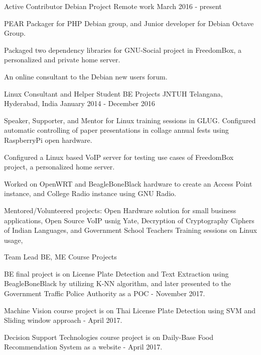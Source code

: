 \begin{cventries}
    \cventry 
    {Active Contributor}
    {Debian Project}
    {Remote work}
    {March 2016 - present}
    {\begin{cvitems}
        \item {PEAR Packager for PHP Debian group, and Junior developer for Debian Octave Group.}
        \item {Packaged two dependency libraries for GNU-Social project in FreedomBox, a personalized and private home server.}
        \item {An online consultant to the Debian new users forum.}
    \end{cvitems}}
    \cventry
    {Linux Consultant and Helper Student BE Projects}
    {JNTUH}
    {Telangana, Hyderabad, India}
    {January 2014 - December 2016}
    {
        \begin{cvitems}
        \item {Speaker, Supporter, and Mentor for Linux training sessions in GLUG. Configured automatic controlling of paper presentations in collage annual fests using RaspberryPi open hardware.}
        \item Configured a Linux based VoIP server for testing use cases of FreedomBox project, a personalized home server.
        \item {Worked on OpenWRT and BeagleBoneBlack hardware to create an Access Point instance, and College Radio instance using GNU Radio.}
        \item {Mentored/Volunteered projects: Open Hardware solution for small business applications, Open Source VoIP usnig Yate, Decryption of Cryptography Ciphers of Indian Languages, and Government School Teachers Training sessions on Linux usage,}
        \end{cvitems}
    }
    \cventry
    {Team Lead}
    {BE, ME Course Projects}
    {}
    {}
    {
        \begin{cvitems}
            \item {BE final project is on  License Plate Detection and Text Extraction using BeagleBoneBlack by utilizing K-NN algorithm, and later presented to the Government Traffic Police Authority as a POC - November 2017.}
            \item {Machine Vision course project is on Thai License Plate Detection using SVM and Sliding window approach - April 2017.}
            \item {Decision Support Technologies course project is on Daily-Base Food Recommendation System as a website - April 2017.}

\end{cvitems}}
\end{cventries}
